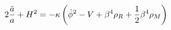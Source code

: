 \begin{equation}\label{einstein22}
 2\frac{\ddot{a}}{a}+H^2=- \kappa \left(\dot{\phi}^2 -V +
\beta^4 \rho_R +{1\over 2} \beta^4 \rho_M \right)
\end{equation}


